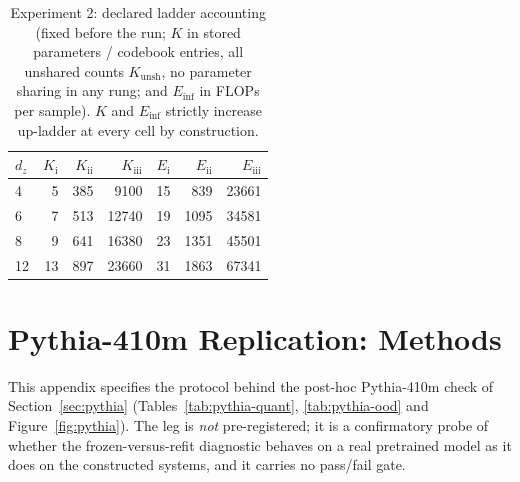 \documentclass[twocolumn,10pt]{article}
\theoremstyle{definition}
\theoremstyle{remark}
\newcommand{\dz}{d_z}
\newcommand{\Kunsh}{K_{\mathrm{unsh}}}
\begin{document}
\begin{table}[H]
\centering
\caption{Experiment 2: declared ladder accounting (fixed before the run; $K$ in
stored parameters / codebook entries, all unshared counts $\Kunsh$,
no parameter sharing in any rung; and $E_{\mathrm{inf}}$
in FLOPs per
sample). $K$ and $E_{\mathrm{inf}}$ strictly increase up-ladder at every
cell by construction.}
\label{tab:e2-ladder}
\begin{tabular}{lrrrrrr}
\toprule
$\dz$ & $K_{\mathrm{i}}$ & $K_{\mathrm{ii}}$ & $K_{\mathrm{iii}}$ &
$E_{\mathrm{i}}$ & $E_{\mathrm{ii}}$ & $E_{\mathrm{iii}}$ \\
\midrule
4 & 5 & 385 & 9100 & 15 & 839 & 23661 \\
6 & 7 & 513 & 12740 & 19 & 1095 & 34581 \\
8 & 9 & 641 & 16380 & 23 & 1351 & 45501 \\
12 & 13 & 897 & 23660 & 31 & 1863 & 67341 \\
\bottomrule
\end{tabular}
\end{table}

\section{Pythia-410m Replication: Methods}
\label{app:pythia}

This appendix specifies the protocol behind the post-hoc Pythia-410m
check of Section~\ref{sec:pythia} (Tables~\ref{tab:pythia-quant},
\ref{tab:pythia-ood} and Figure~\ref{fig:pythia}). The leg is
\emph{not} pre-registered; it is a confirmatory probe of whether the
frozen-versus-refit diagnostic behaves on a real pretrained model as it
does on the constructed systems, and it carries no pass/fail gate.
\end{document}

